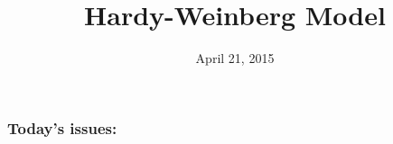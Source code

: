 





\title[Hardy-Weinberg Model]{Hardy-Weinberg Model}
\date{April 21, 2015}



\begin{noheadline}
\maketitle
\end{noheadline}


\begin{noheadline}
\begin{frame}
\frametitle{Today's issues:}
\vspace{5mm}
\tableofcontents[subsectionstyle=hide]
\end{frame}
\end{noheadline}

